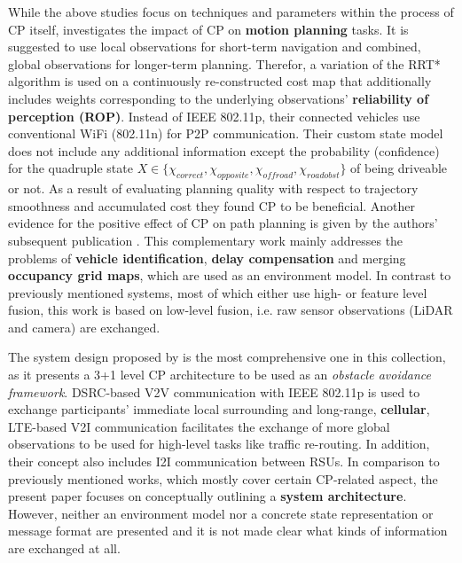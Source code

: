 While the above studies focus on techniques and parameters within the process of CP itself, \cite{liu2013motion} investigates the impact of CP on \textbf{motion planning} tasks. It is suggested to use local observations for short-term navigation and combined, global observations for longer-term planning. Therefor, a variation of the RRT* algorithm is used on a continuously re-constructed cost map that additionally includes weights corresponding to the underlying observations' \textbf{reliability of perception (ROP)}. Instead of IEEE 802.11p, their connected vehicles use conventional WiFi (802.11n) for P2P communication. Their custom state model does not include any additional information except the probability (confidence) for the quadruple state $X \in \{\chi_{correct}, \chi_{opposite}, \chi_{offroad}, \chi_{roadobst}\}$ of being driveable or not. As a result of evaluating planning quality with respect to trajectory smoothness and accumulated cost they found CP to be beneficial. Another evidence for the positive effect of CP on path planning is given by the authors' subsequent publication \cite{kim2013cooperative}. This complementary work mainly addresses the problems of \textbf{vehicle identification}, \textbf{delay compensation} and merging \textbf{occupancy grid maps}, which are used as an environment model. In contrast to previously mentioned systems, most of which either use high- or feature level fusion, this work is based on low-level fusion, i.e. raw sensor observations (LiDAR and camera) are exchanged. 
\par
\bigskip

The system design proposed by \cite{Calvo2017} is the most comprehensive one in this collection, as it presents a 3+1 level CP architecture to be used as an \textit{obstacle avoidance framework}. DSRC-based V2V communication with IEEE 802.11p is used to exchange participants' immediate local surrounding and long-range, \textbf{cellular}, LTE-based V2I communication facilitates the exchange of more global observations to be used for high-level tasks like traffic re-routing. In addition, their concept also includes I2I communication between RSUs. In comparison to previously mentioned works, which mostly cover certain CP-related aspect, the present paper focuses on conceptually outlining a \textbf{system architecture}. However, neither an environment model nor a concrete state representation or message format are presented and it is not made clear what kinds of information are exchanged at all. 
\par
\bigskip

